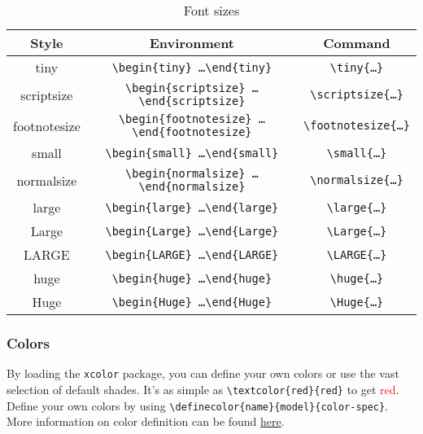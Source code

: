 \begin{table}[h]
	\centering
	\caption{Font sizes}
	\label{tab:fontsizes}
\begin{small}
    \begin{tabular}{c c c}
      \hline
      Style               & Environment                                                                 & Command \\
      \hline
      \tiny{tiny}         & \texttt{\textbackslash begin\{tiny\} \ldots \textbackslash end\{tiny\}}      & \texttt{\textbackslash tiny\{\ldots\}}\\
      \scriptsize{scriptsize} & \texttt{\textbackslash begin\{scriptsize\} \ldots \textbackslash end\{scriptsize\}}      & \texttt{\textbackslash scriptsize\{\ldots\}}\\
      \footnotesize{footnotesize} & \texttt{\textbackslash begin\{footnotesize\} \ldots \textbackslash end\{footnotesize\}}      & \texttt{\textbackslash footnotesize\{\ldots\}}\\
      \small{small} & \texttt{\textbackslash begin\{small\} \ldots \textbackslash end\{small\}}      & \texttt{\textbackslash small\{\ldots\}}\\
      \normalsize{normalsize} & \texttt{\textbackslash begin\{normalsize\} \ldots \textbackslash end\{normalsize\}}      & \texttt{\textbackslash normalsize\{\ldots\}}\\
      \large{large} & \texttt{\textbackslash begin\{large\} \ldots \textbackslash end\{large\}}      & \texttt{\textbackslash large\{\ldots\}}\\
      \Large{Large} & \texttt{\textbackslash begin\{Large\} \ldots \textbackslash end\{Large\}}      & \texttt{\textbackslash Large\{\ldots\}}\\
      \LARGE{LARGE} & \texttt{\textbackslash begin\{LARGE\} \ldots \textbackslash end\{LARGE\}}      & \texttt{\textbackslash LARGE\{\ldots\}}\\
      \huge{huge} & \texttt{\textbackslash begin\{huge\} \ldots \textbackslash end\{huge\}}      & \texttt{\textbackslash huge\{\ldots\}}\\
      \Huge{Huge} & \texttt{\textbackslash begin\{Huge\} \ldots \textbackslash end\{Huge\}}      & \texttt{\textbackslash Huge\{\ldots\}}\\
      \hline
    \end{tabular}
\end{small}
\end{table}


\subsubsection*{Colors}

By loading the \texttt{xcolor} package, you can define your own colors or use the vast selection of default shades. It's as simple as \verb|\textcolor{red}{red}| to get \textcolor{red}{red}. Define your own colors by using \verb|\definecolor{name}{model}{color-spec}|. More information on color definition can be found \href{https://www.sharelatex.com/learn/Using_colours_in_LaTeX}{here}.